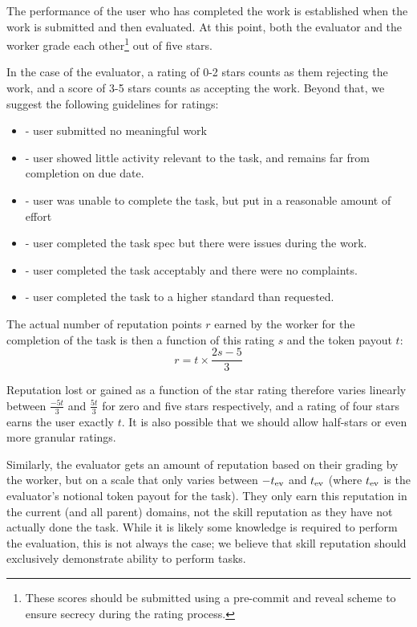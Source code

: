 The performance of the user who has completed the work is established when the work is submitted and then evaluated. At this point, both the evaluator and the worker grade each other\footnote{These scores should be submitted using a pre-commit and reveal scheme to ensure secrecy during the rating process.} out of five stars.

In the case of the evaluator, a rating of 0-2 stars counts as them rejecting the work, and a score of 3-5 stars counts as accepting the work. Beyond that, we suggest the following guidelines for ratings:
\begin{itemize}
 \item[0 stars] - user submitted no meaningful work 
 \item[1 star\phantom{s}] - user showed little activity relevant to the task, and remains far from completion on due date.
 \item[2 stars] - user was unable to complete the task, but put in a reasonable amount of effort
 \item[3 stars] - user completed the task spec but there were issues during the work.
 \item[4 stars] - user completed the task acceptably and there were no complaints.
 \item[5 stars] - user completed the task to a higher standard than requested.
\end{itemize}

The actual number of reputation points $r$ earned by the worker for the completion of the task is then a function of this rating $s$ and the token payout $t$:
\begin{equation}\label{eq:stars-to-rep}
 r = t \times \frac{2s - 5}{3} 
\end{equation}
 
Reputation lost or gained as a function of the star rating therefore varies linearly between $\frac{-5t}{3}$ and $\frac{5t}{3}$ for zero and five stars respectively, and a rating of four stars earns the user exactly $t$. It is also possible that we should allow half-stars or even more granular ratings.

Similarly, the evaluator gets an amount of reputation based on their grading by the worker, but on a scale that only varies between $-t_{\rm ev}$ and $t_{\rm ev}$ (where $t_{\rm ev}$ is the evaluator's notional token payout for the task). They only earn this reputation in the current (and all parent) domains, not the skill reputation as they have not actually done the task. While it is likely some knowledge is required to perform the evaluation, this is not always the case; we believe that skill reputation should exclusively demonstrate ability to perform tasks.


